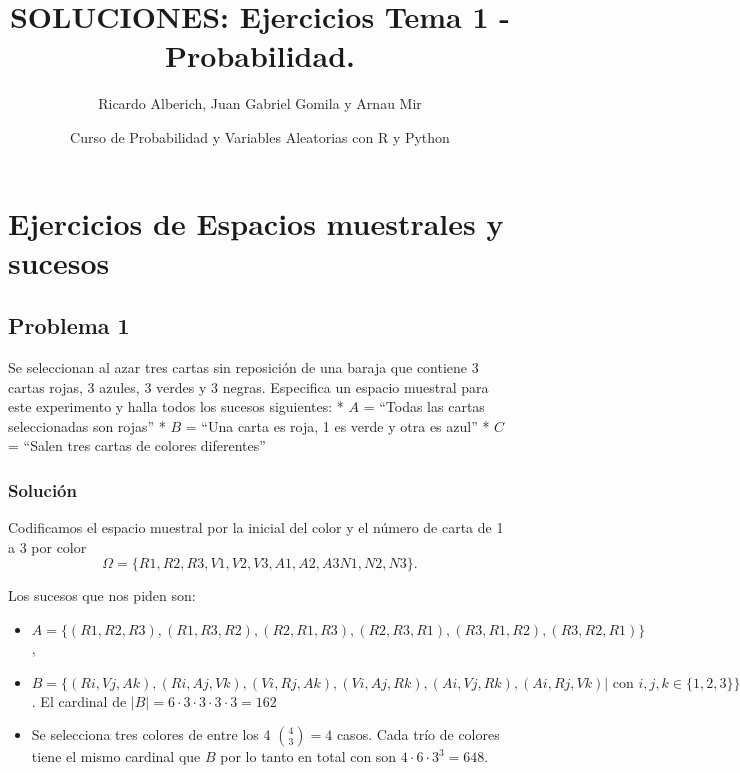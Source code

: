 \documentclass[
]{article}
\title{SOLUCIONES: Ejercicios Tema 1 - Probabilidad.}
\author{Ricardo Alberich, Juan Gabriel Gomila y Arnau Mir}
\date{Curso de Probabilidad y Variables Aleatorias con R y Python}
\providecommand{\tightlist}{%
  \setlength{\itemsep}{0pt}\setlength{\parskip}{0pt}}
\begin{document}
\maketitle

{
\hypersetup{linkcolor=blue}
\setcounter{tocdepth}{2}
\tableofcontents
}
\hypertarget{ejercicios-de-espacios-muestrales-y-sucesos}{%
\section{Ejercicios de Espacios muestrales y
sucesos}\label{ejercicios-de-espacios-muestrales-y-sucesos}}

\hypertarget{problema-1}{%
\subsection{Problema 1}\label{problema-1}}

Se seleccionan al azar tres cartas sin reposición de una baraja que
contiene 3 cartas rojas, 3 azules, 3 verdes y 3 negras. Especifica un
espacio muestral para este experimento y halla todos los sucesos
siguientes: * \(A\) = ``Todas las cartas seleccionadas son rojas'' *
\(B\) = ``Una carta es roja, 1 es verde y otra es azul'' * \(C\) =
``Salen tres cartas de colores diferentes''

\hypertarget{soluciuxf3n}{%
\subsubsection{Solución}\label{soluciuxf3n}}

Codificamos el espacio muestral por la inicial del color y el número de
carta de 1 a 3 por color
\[\Omega=\{R1, R2, R3, V1, V2, V3, A1, A2, A3  N1, N2, N3 \}.\]

Los sucesos que nos piden son:

\begin{itemize}
\tightlist
\item
  \(A=\{(R1, R2, R3),(R1, R3, R2),(R2, R1, R3),(R2, R3, R1),(R3, R1, R2), (R3, R2, R1)\}\),
\item
  \(B=\{(Ri,Vj,Ak),(Ri,Aj,Vk),(Vi,Rj,Ak),(Vi,Aj,Rk),(Ai,Vj,Rk),(Ai,Rj,Vk) | \mbox{ con } i,j,k\in\{1,2,3\}\}\).
  El cardinal de \(\left|B\right|=6\cdot 3\cdot 3\cdot 3\cdot 3= 162\)
\item
  Se selecciona tres colores de entre los 4 \({{4}\choose {3}}=4\)
  casos. Cada trío de colores tiene el mismo cardinal que \(B\) por lo
  tanto en total con son \(4\cdot 6\cdot 3^3=648\).
\end{itemize}
\end{document}
